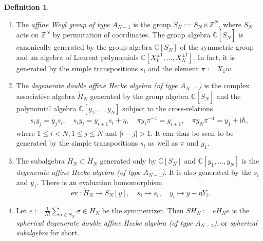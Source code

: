 \documentclass[11pt]{report}
\theoremstyle{definition}
\newtheorem{definition}[theorem]{Definition}
\theoremstyle{remark}
\theoremstyle{remark}
\newcommand{\Z}{\mathbb{Z}}
\newcommand{\C}{\mathbb{C}}
\newcommand{\I}{\mathrm{i}}
\begin{document}
\begin{definition}
\begin{enumerate}[label=(\roman*)]
\item The \emph{affine Weyl group of type $A_{N-1}$} is the group $\dot S_N := S_N \ltimes \Z^N$, where $S_N$ acts on $\Z^N$ by permutation of coordinates. The group algebra $\C[\dot S_N]$ is canonically generated by the group algebra $\C[S_N]$ of the symmetric group and an algebra of Laurent polynomials $\C[X_1^{\pm 1},...,X_N^{\pm 1}]$. In fact, it is generated by the simple transpositions $s_i$ and the element $\pi := X_1 w$.
\item The \emph{degenerate double affine Hecke algebra (of type $A_{N-1}$)} is the complex associative algebra $\ddot H_N$ generated by the group algebra $\C[\dot S_N]$ and the polynomial algebra $\C[y_1,...,y_N]$ subject to the cross-relations
\begin{align*}
s_i y_j = y_j s_i, \quad s_i y_i = y_{i+1} s_i + \eta, \quad \pi y_i \pi^{-1} = y_{i+1}, \quad \pi y_N \pi^{-1} = y_1 + \I \hbar,
\end{align*}
where $1 \leq i < N, 1 \leq j \leq N$ and $|i-j|>1$. It can thus be seen to be generated by the simple transpositions $s_i$ as well as $\pi$ and $y_1$.
\item The subalgebra $\dot H_N \subset \ddot H_N$ generated only by $\C[S_N]$ and $\C[y_1,...,y_N]$ is the \emph{degenerate affine Hecke algebra (of type $A_{N-1}$)}. It is also generated by the $s_i$ and $y_1$. There is an evaluation homomorphism
\begin{equation}\label{equation:degHeckeEval}
\operatorname{ev}: \dot H_N \to S_N[y], \quad s_i \mapsto s_i, \quad y_i \mapsto y - \eta Y_i.
\end{equation}
\item Let $e := \frac{1}{N!}\sum_{\sigma \in S_N} \sigma \in \ddot H_N$ be the symmetrizer. Then $S\ddot H_N := e \ddot H_N e$ is the \emph{spherical degenerate double affine Hecke algebra (of type $A_{N-1}$)}, or \emph{spherical subalgebra} for short.
\end{enumerate}
\end{definition}
\end{document}
